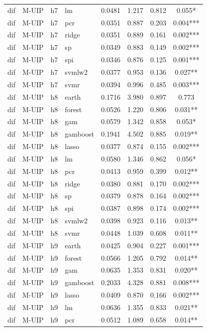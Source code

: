 \begin{ThreePartTable}
\begin{longtable}[t]{llclcccc}
dif & M-UIP & h7 & lm & 0.0481 & 1.217 & 0.812 & 0.055*\\
dif & M-UIP & h7 & pcr & 0.0351 & 0.887 & 0.203 & 0.004***\\
dif & M-UIP & h7 & ridge & 0.0351 & 0.889 & 0.161 & 0.002***\\
dif & M-UIP & h7 & sp & 0.0349 & 0.883 & 0.149 & 0.002***\\
dif & M-UIP & h7 & spi & 0.0346 & 0.876 & 0.125 & 0.001***\\
dif & M-UIP & h7 & svmlw2 & 0.0377 & 0.953 & 0.136 & 0.027**\\
dif & M-UIP & h7 & svmr & 0.0394 & 0.996 & 0.485 & 0.003***\\
\addlinespace
dif & M-UIP & h8 & earth & 0.1716 & 3.980 & 0.897 & 0.773\\
dif & M-UIP & h8 & forest & 0.0526 & 1.220 & 0.806 & 0.031**\\
dif & M-UIP & h8 & gam & 0.0579 & 1.342 & 0.858 & 0.053*\\
dif & M-UIP & h8 & gamboost & 0.1941 & 4.502 & 0.885 & 0.019**\\
dif & M-UIP & h8 & lasso & 0.0377 & 0.874 & 0.155 & 0.002***\\
dif & M-UIP & h8 & lm & 0.0580 & 1.346 & 0.862 & 0.056*\\
dif & M-UIP & h8 & pcr & 0.0413 & 0.959 & 0.399 & 0.012**\\
dif & M-UIP & h8 & ridge & 0.0380 & 0.881 & 0.170 & 0.002***\\
dif & M-UIP & h8 & sp & 0.0379 & 0.878 & 0.164 & 0.002***\\
dif & M-UIP & h8 & spi & 0.0387 & 0.898 & 0.174 & 0.002***\\
dif & M-UIP & h8 & svmlw2 & 0.0398 & 0.923 & 0.116 & 0.013**\\
dif & M-UIP & h8 & svmr & 0.0448 & 1.039 & 0.608 & 0.011**\\
\addlinespace
dif & M-UIP & h9 & earth & 0.0425 & 0.904 & 0.227 & 0.001***\\
dif & M-UIP & h9 & forest & 0.0566 & 1.205 & 0.792 & 0.014**\\
dif & M-UIP & h9 & gam & 0.0635 & 1.353 & 0.831 & 0.020**\\
dif & M-UIP & h9 & gamboost & 0.2033 & 4.328 & 0.881 & 0.008***\\
dif & M-UIP & h9 & lasso & 0.0409 & 0.870 & 0.166 & 0.002***\\
dif & M-UIP & h9 & lm & 0.0636 & 1.355 & 0.833 & 0.021**\\
dif & M-UIP & h9 & pcr & 0.0512 & 1.089 & 0.658 & 0.014**\\

\end{longtable}
\end{ThreePartTable}
